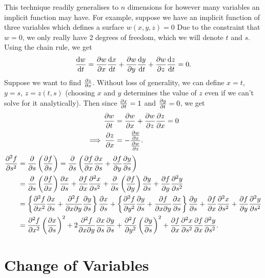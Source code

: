 \documentclass[../multivariate_calculus.tex]{subfiles}
\begin{document}
        This technique readily generalises to $n$ dimensions for however many variables an implicit function may have.
        For example, suppose we have an implicit function of three variables which defines a surface $w(x,y,z)=0$
        Due to the constraint that $w=0$, we only really have 2 degrees of freedom, which we will denote $t$ and $s$.
        Using the chain rule, we get
        \begin{equation}
            \dv{w}{t}=\pdv{w}{x}\dv{x}{t}+\pdv{w}{y}\dv{y}{t}+\pdv{w}{z}\dv{z}{t}=0.
        \end{equation}
        Suppose we want to find $\pdv{z}{x}$.
        Without loss of generality, we can define $x=t$, $y=s$, $z=z(t,s)$ (choosing $x$ and $y$ determines the value of $z$ even if we can't solve for it analytically).
        Then since $\pdv{x}{t}=1$ and $\pdv{y}{t}=0$, we get
        \begin{align}
            \pdv{w}{t}&=\pdv{w}{x}+\pdv{w}{z}\pdv{z}{x}=0\\
            \implies\pdv{z}{x}&=-\frac{\pdv{w}{x}}{\pdv{w}{z}}.
        \end{align}
        \begin{align}
            \pdv[2]{f}{s}&=\frac{\partial}{\partial s}\left(\pdv{f}{s}\right)=\frac{\partial}{\partial s}\left(\pdv{f}{x}\pdv{x}{s}+\pdv{f}{y}\pdv{y}{s}\right)\\
            &=\frac{\partial}{\partial s}\left(\pdv{f}{x}\right)\pdv{x}{s}+\pdv{f}{x}\pdv[2]{x}{s}+\frac{\partial}{\partial s}\left(\pdv{f}{y}\right)\pdv{y}{s}+\pdv{f}{y}\pdv[2]{y}{s}\\
            &=\left\{\pdv[2]{f}{x}\pdv{x}{s}+\frac{\partial^2 f}{\partial x\partial y}\pdv{y}{s}\right\}\pdv{x}{s}+\left\{\pdv[2]{f}{y}\pdv{y}{s}+\frac{\partial f}{\partial x\partial y}\pdv{x}{s}\right\}\pdv{y}{s}+\pdv{f}{x}\pdv[2]{x}{s}+\pdv{f}{y}\pdv[2]{y}{s}\\
            &=\pdv[2]{f}{x}\left(\pdv{x}{s}\right)^2+2\frac{\partial^2 f}{\partial x\partial y}\pdv{x}{s}\pdv{y}{s}+\pdv[2]{f}{y}\left(\pdv{y}{s}\right)^2+\pdv{f}{x}\pdv[2]{x}{s}\pdv{f}{x}\pdv[2]{y}{s}.
        \end{align}

    \section{Change of Variables}
\end{document}
